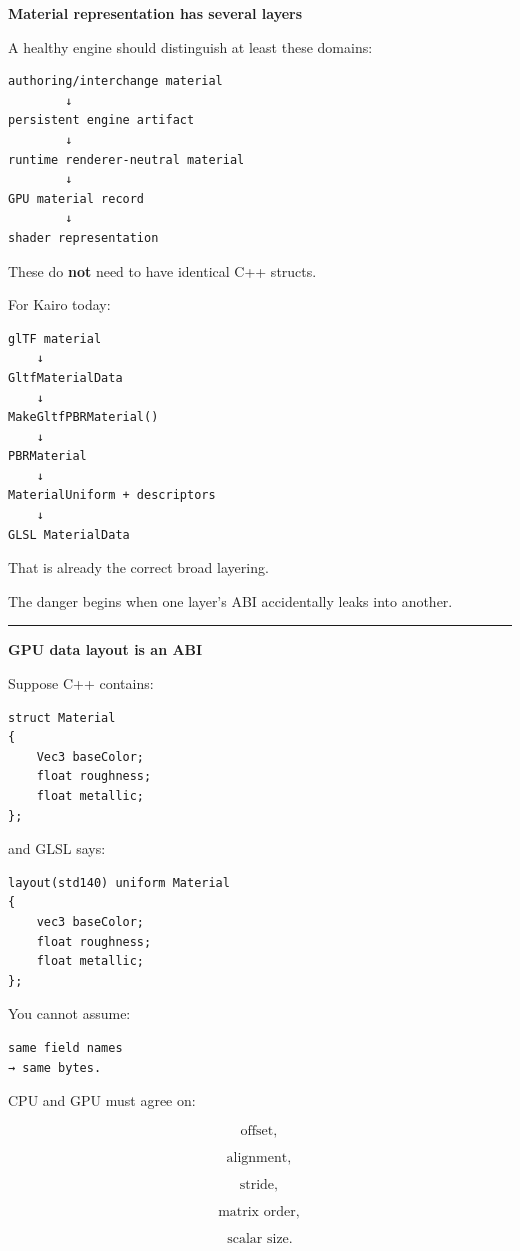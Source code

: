 \textbf{Material representation has several layers}

A healthy engine should distinguish at least these domains:

\begin{verbatim}
authoring/interchange material
        ↓
persistent engine artifact
        ↓
runtime renderer-neutral material
        ↓
GPU material record
        ↓
shader representation
\end{verbatim}

These do \textbf{not} need to have identical C++ structs.

For Kairo today:

\begin{verbatim}
glTF material
    ↓
GltfMaterialData
    ↓
MakeGltfPBRMaterial()
    ↓
PBRMaterial
    ↓
MaterialUniform + descriptors
    ↓
GLSL MaterialData
\end{verbatim}

That is already the correct broad layering.

The danger begins when one layer's ABI accidentally leaks into another.

\begin{center}\rule{0.5\linewidth}{0.5pt}\end{center}

\textbf{GPU data layout is an ABI}

Suppose C++ contains:

\begin{verbatim}
struct Material
{
    Vec3 baseColor;
    float roughness;
    float metallic;
};
\end{verbatim}

and GLSL says:

\begin{verbatim}
layout(std140) uniform Material
{
    vec3 baseColor;
    float roughness;
    float metallic;
};
\end{verbatim}

You cannot assume:

\begin{verbatim}
same field names
→ same bytes.
\end{verbatim}

CPU and GPU must agree on:

\[
\text{offset},
\]

\[
\text{alignment},
\]

\[
\text{stride},
\]

\[
\text{matrix order},
\]

\[
\text{scalar size}.
\]

